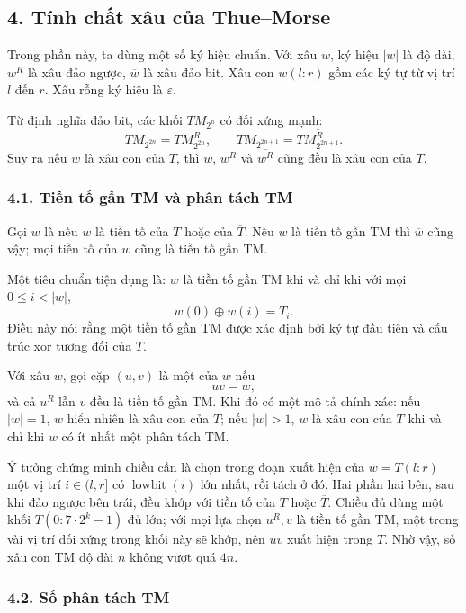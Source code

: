 \documentclass[11pt]{article}
\begin{document}
\subsection*{4. Tính chất xâu của Thue--Morse}

Trong phần này, ta dùng một số ký hiệu chuẩn. Với xâu \(w\), ký hiệu \(|w|\) là
độ dài, \(w^R\) là xâu đảo ngược, \(\overline w\) là xâu đảo bit. Xâu con
\(w(l:r)\) gồm các ký tự từ vị trí \(l\) đến \(r\). Xâu rỗng ký hiệu là
\(\varepsilon\).

Từ định nghĩa đảo bit, các khối \(TM_{2^n}\) có đối xứng mạnh:
\[
  TM_{2^{2n}}=TM_{2^{2n}}^R,\qquad
  TM_{2^{2n+1}}=\overline{TM_{2^{2n+1}}^R}.
\]
Suy ra nếu \(w\) là xâu con của \(T\), thì \(\overline w\), \(w^R\) và
\(\overline{w^R}\) cũng đều là xâu con của \(T\).

\subsubsection*{4.1. Tiền tố gần TM và phân tách TM}

Gọi \(w\) là  nếu \(w\) là tiền tố của \(T\) hoặc của
\(\overline T\). Nếu \(w\) là tiền tố gần TM thì \(\overline w\) cũng vậy; mọi
tiền tố của \(w\) cũng là tiền tố gần TM.

Một tiêu chuẩn tiện dụng là: \(w\) là tiền tố gần TM khi và chỉ khi với mọi
\(0\le i<|w|\),
\[
  w(0)\oplus w(i)=T_i.
\]
Điều này nói rằng một tiền tố gần TM được xác định bởi ký tự đầu tiên và cấu
trúc xor tương đối của \(T\).

Với xâu \(w\), gọi cặp \((u,v)\) là một  của \(w\) nếu
\[
  uv=w,
\]
và cả \(u^R\) lẫn \(v\) đều là tiền tố gần TM. Khi đó có một mô tả chính xác:
nếu \(|w|=1\), \(w\) hiển nhiên là xâu con của \(T\); nếu \(|w|>1\), \(w\) là
xâu con của \(T\) khi và chỉ khi \(w\) có ít nhất một phân tách TM.

Ý tưởng chứng minh chiều cần là chọn trong đoạn xuất hiện của \(w=T(l:r)\) một
vị trí \(i\in(l,r]\) có \(\operatorname{lowbit}(i)\) lớn nhất, rồi tách ở đó.
Hai phần hai bên, sau khi đảo ngược bên trái, đều khớp với tiền tố của \(T\)
hoặc \(\overline T\). Chiều đủ dùng một khối \(T(0:7\cdot2^k-1)\) đủ lớn; với
mọi lựa chọn \(u^R,v\) là tiền tố gần TM, một trong vài vị trí đối xứng trong
khối này sẽ khớp, nên \(uv\) xuất hiện trong \(T\). Nhờ vậy, số xâu con TM độ
dài \(n\) không vượt quá \(4n\).

\subsubsection*{4.2. Số phân tách TM}
\end{document}
